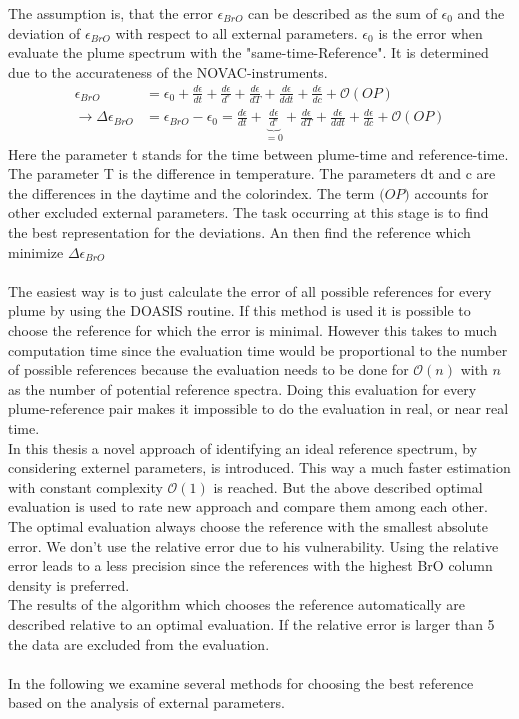 \documentclass  [
  paper    = a4,
  BCOR     = 10mm,
  twoside,
  fontsize = 12pt,
  fleqn,
  toc      = bibnumbered,
  toc      = listofnumbered,
  numbers  = noendperiod,
  headings = normal,
  listof   = leveldown,
  version  = 3.03
]                                       {scrreprt}
\begin{document}
	The assumption is, that the  error $\epsilon_{BrO}$ can be described as the sum of $\epsilon_{0}$ and the deviation of $\epsilon_{BrO}$ with respect to all external parameters. $\epsilon_{0}$ is the  error when evaluate the plume spectrum with the "same-time-Reference". It is determined due to the accurateness of the NOVAC-instruments.
	\begin{align}
		\epsilon_{BrO} &=  \epsilon_{0}+\frac{d\epsilon}{dt}+\frac{d\epsilon}{d ^{\circ}}+\frac{d\epsilon}{dT}+\frac{d\epsilon}{ddt} +\frac{d\epsilon}{dc} + \mathcal{O}\left(OP\right) \\
		\rightarrow \Delta \epsilon_{BrO} &= \epsilon_{BrO} - \epsilon_{0} =\frac{d\epsilon}{dt}+\underbrace{\frac{d\epsilon}{d ^{\circ}}}_{=0}+\frac{d\epsilon}{dT}+\frac{d\epsilon}{ddt} +\frac{d\epsilon}{dc} + \mathcal{O}\left(OP\right) 
		\label{calc:err}
	\end{align}
	Here the parameter t stands for the time between plume-time and reference-time. The parameter T is the difference in temperature. The parameters dt and c are the differences in the daytime and the colorindex. The term $\mathcal(OP)$ accounts for other excluded external parameters.
	The task occurring at this stage is to find the best representation for the deviations. An then find the reference which minimize $\Delta \epsilon_{BrO} $\\
	\\
	The easiest way is to just calculate the  error of all possible references for every plume by using the DOASIS routine. If this method is used it is possible to choose the reference for which the  error is minimal. However this takes to much computation time since the evaluation time would be proportional to the number of possible references because the evaluation needs to be done for $\mathcal{O}(n)$ with $n$ as the number of potential reference spectra. Doing this evaluation for every plume-reference pair makes it impossible to do the evaluation in real, or near real time.\\
	In this thesis a novel approach of identifying an ideal reference spectrum, by considering externel parameters, is introduced. This way a much faster estimation with constant complexity $\mathcal{O}(1)$ is reached.
	But the above described optimal evaluation is used to rate new approach and compare them among each other. The optimal evaluation always choose the reference with the smallest absolute error. We don't use the relative error due to his vulnerability. Using the relative error leads to a less precision since the references with the highest BrO column density is preferred.\\
	The results of the algorithm which chooses the reference automatically are described relative to an optimal evaluation. If the relative error is larger than 5 the data are excluded from the evaluation.\\
	\\
	In the following we examine several methods for choosing the best reference based on the analysis of external parameters. 
	
\end{document}

